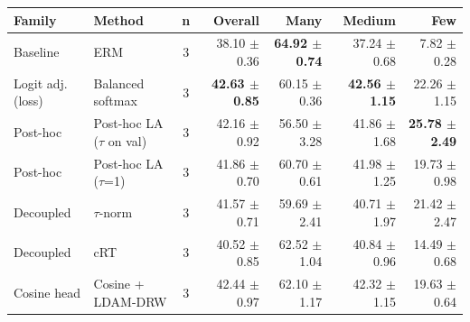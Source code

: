 \begin{tabular}{llcrrrr}
\toprule
Family & Method & n & Overall & Many & Medium & Few \\
\midrule
Baseline & ERM & 3 & 38.10 $\pm$ 0.36 & \textbf{64.92 $\pm$ 0.74} & 37.24 $\pm$ 0.68 & 7.82 $\pm$ 0.28 \\
Logit adj. (loss) & Balanced softmax & 3 & \textbf{42.63 $\pm$ 0.85} & 60.15 $\pm$ 0.36 & \textbf{42.56 $\pm$ 1.15} & 22.26 $\pm$ 1.15 \\
Post-hoc & Post-hoc LA ($\tau$ on val) & 3 & 42.16 $\pm$ 0.92 & 56.50 $\pm$ 3.28 & 41.86 $\pm$ 1.68 & \textbf{25.78 $\pm$ 2.49} \\
Post-hoc & Post-hoc LA ($\tau$=1) & 3 & 41.86 $\pm$ 0.70 & 60.70 $\pm$ 0.61 & 41.98 $\pm$ 1.25 & 19.73 $\pm$ 0.98 \\
Decoupled & $\tau$-norm & 3 & 41.57 $\pm$ 0.71 & 59.69 $\pm$ 2.41 & 40.71 $\pm$ 1.97 & 21.42 $\pm$ 2.47 \\
Decoupled & cRT & 3 & 40.52 $\pm$ 0.85 & 62.52 $\pm$ 1.04 & 40.84 $\pm$ 0.96 & 14.49 $\pm$ 0.68 \\
Cosine head & Cosine + LDAM-DRW & 3 & 42.44 $\pm$ 0.97 & 62.10 $\pm$ 1.17 & 42.32 $\pm$ 1.15 & 19.63 $\pm$ 0.64 \\
\bottomrule
\end{tabular}